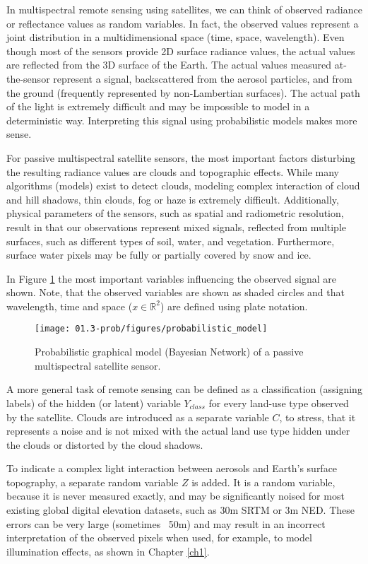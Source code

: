 In multispectral remote sensing using satellites, we can think of observed radiance or reflectance values as random variables. In fact, the observed values represent a joint distribution in a multidimensional space (time, space, wavelength). Even though most of the sensors provide 2D surface radiance values, the actual values are reflected from the 3D surface of the Earth. The actual values measured at-the-sensor represent a signal, backscattered from the aerosol particles, and from the ground (frequently represented by non-Lambertian surfaces). The actual path of the light is extremely difficult and may be impossible to model in a deterministic way. Interpreting this signal using probabilistic models makes more sense.

For passive multispectral satellite sensors, the most important factors disturbing the resulting radiance values are clouds and topographic effects. While many algorithms (models) exist to detect clouds, modeling complex interaction of cloud and hill shadows, thin clouds, fog or haze is extremely difficult. Additionally, physical parameters of the sensors, such as spatial and radiometric resolution, result in that our observations represent mixed signals, reflected from multiple surfaces, such as different types of soil, water, and vegetation. Furthermore, surface water pixels may be fully or partially covered by snow and ice.

In Figure \ref{fig:pgm} the most important variables influencing the observed signal are shown. Note, that the observed variables are shown as shaded circles and that wavelength, time and space ($x \in \mathbb{R}^2$) are defined using plate notation.

\begin{figure}
	\centering
	\texttt{[image: 01.3-prob/figures/probabilistic\_model]} 
	\caption{Probabilistic graphical model (Bayesian Network) of a passive multispectral satellite sensor.}
	\label{fig:pgm}
\end{figure}

A more general task of remote sensing can be defined as a classification (assigning labels) of the hidden (or latent) variable $Y_{class}$ for every land-use type observed by the satellite. Clouds are introduced as a separate variable $C$, to stress, that it represents a noise and is not mixed with the actual land use type hidden under the clouds or distorted by the cloud shadows. 

To indicate a complex light interaction between aerosols and Earth's surface topography, a separate random variable $Z$ is added. It is a random variable, because it is never measured exactly, and may be significantly noised for most existing global digital elevation datasets, such as 30m SRTM or 3m NED. These errors can be very large (sometimes ~50m) and may result in an incorrect interpretation of the observed pixels when used, for example, to model illumination effects, as shown in Chapter \ref{ch1}.

